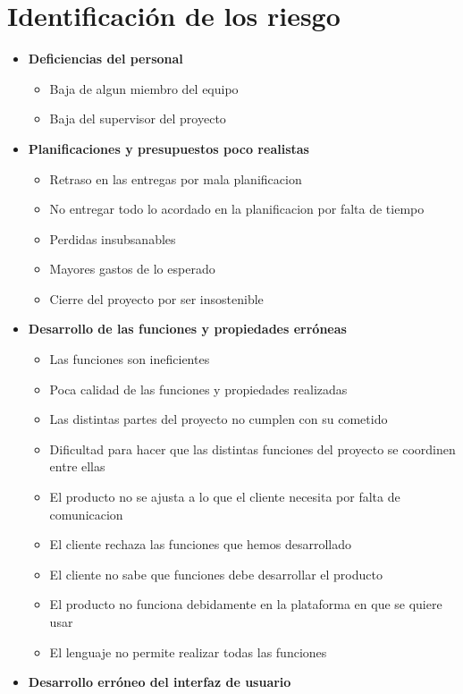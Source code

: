 \documentclass[spanish,a4paper,12pt]{report}	%
\begin{document}
\part{Identificación de los riesgo}
\begin{itemize}
\item \textbf {Deficiencias del personal}
	\begin{itemize}
		\item {Baja de algun miembro del equipo}
		\item {Baja del supervisor del proyecto}
	\end{itemize}
\item \textbf {Planificaciones y presupuestos poco realistas}
	\begin{itemize}
		\item {Retraso en las entregas por mala planificacion}
		\item {No entregar todo lo acordado en la planificacion por falta de tiempo}
		\item {Perdidas insubsanables}
		\item {Mayores gastos de lo esperado}
		\item {Cierre del proyecto por ser insostenible}
	\end{itemize}
\item \textbf {Desarrollo de las funciones y propiedades erróneas}
	\begin{itemize}
		\item {Las funciones son ineficientes}
		\item {Poca calidad de las funciones y propiedades realizadas}
		\item {Las distintas partes del proyecto no cumplen con su cometido}
		\item {Dificultad para hacer que las distintas funciones del proyecto se coordinen entre ellas}
		\item {El producto no se ajusta a lo que el cliente necesita por falta de comunicacion}
		\item {El cliente rechaza las funciones que hemos desarrollado}
		\item {El cliente no sabe que funciones debe desarrollar el producto}
		\item {El producto no funciona debidamente en la plataforma en que se quiere usar}
		\item {El lenguaje no permite realizar todas las funciones}
	\end{itemize}
\item \textbf {Desarrollo erróneo del interfaz de usuario}

\end{itemize}
\end{document}
